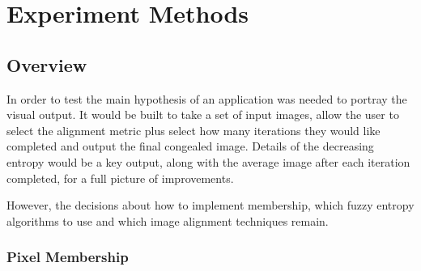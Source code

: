 \chapter{Experiment Methods}





\section{Overview}

In order to test the main hypothesis of  an application was needed to portray the visual output. It would be built to take a set of input images, allow the user to select the alignment metric plus select how many iterations they would like completed and output the final congealed image. Details of the decreasing entropy would be a key output, along with the average image after each iteration completed, for a full picture of improvements.

However, the decisions about how to implement membership, which fuzzy entropy algorithms to use and which image alignment techniques remain.

\subsection{Pixel Membership}
\label{sssec:member}

